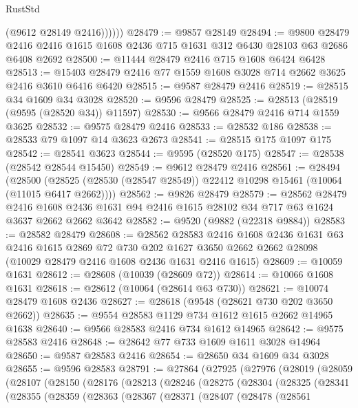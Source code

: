 \begin{lexlean}{RustStd}
\begin{coremodule}
              (@9612 @28149 @2416))))))
@28479 := @9857 @28149
@28494 := @9800
    @28479
    @2416
    @2416
    @1615
    @1608
    @2436
    @715
    @1631
    @312
    @6430
    @28103
    @63
    @2686
    @6408
    @2692
@28500 := @11444 @28479 @2416 @715 @1608 @6424 @6428
@28513 := @15403 @28479 @2416 @77 @1559 @1608 @3028 @714 @2662 @3625 @2416 @3610 @6416 @6420
@28515 := @9587 @28479 @2416
@28519 := @28515 @34 @1609 @34 @3028
@28520 := @9596 @28479
@28525 := @28513 (@28519 (@9595 (@28520 @34)) @11597)
@28530 := @9566 @28479 @2416 @714 @1559 @3625
@28532 := @9575 @28479 @2416
@28533 := @28532 @186
@28538 := @28533 @79 @1097 @14 @3623 @2673
@28541 := @28515 @175 @1097 @175
@28542 := @28541 @3623
@28544 := @9595 (@28520 @175)
@28547 := @28538 (@28542 @28544 @15450)
@28549 := @9612 @28479 @2416
@28561 := @28494
    (@28500 (@28525 (@28530 (@28547 @28549)) @22412 @10298 @15461 (@10064 (@11015 @6417 @2662))))
@28562 := @9826 @28479
@28579 := @28562
    @28479
    @2416
    @1608
    @2436
    @1631
    @94
    @2416
    @1615
    @28102
    @34
    @717
    @63
    @1624
    @3637
    @2662
    @2662
    @3642
@28582 := @9520 (@9882 (@22318 @9884))
@28583 := @28582 @28479
@28608 := @28562
    @28583
    @2416
    @1608
    @2436
    @1631
    @63
    @2416
    @1615
    @2869
    @72
    @730
    @202
    @1627
    @3650
    @2662
    @2662
    @28098
    (@10029 @28479 @2416 @1608 @2436 @1631 @2416 @1615)
@28609 := @10059 @1631
@28612 := @28608 (@10039 (@28609 @72))
@28614 := @10066 @1608 @1631
@28618 := @28612 (@10064 (@28614 @63 @730))
@28621 := @10074 @28479 @1608 @2436
@28627 := @28618 (@9548 (@28621 @730 @202 @3650 @2662))
@28635 := @9554 @28583 @1129 @734 @1612 @1615 @2662 @14965 @1638
@28640 := @9566 @28583 @2416 @734 @1612 @14965
@28642 := @9575 @28583 @2416
@28648 := @28642 @77 @733 @1609 @1611 @3028 @14964
@28650 := @9587 @28583 @2416
@28654 := @28650 @34 @1609 @34 @3028
@28655 := @9596 @28583
@28791 := @27864
    (@27925
      (@27976
        (@28019
          (@28059
            (@28107
              (@28150
                (@28176
                  (@28213
                    (@28246
                      (@28275
                        (@28304
                          (@28325
                            (@28341
                              (@28355
                                (@28359
                                  (@28363
                                    (@28367
                                      (@28371
                                        (@28407
                                          (@28478
                                            (@28561

\end{coremodule}
\end{lexlean}
